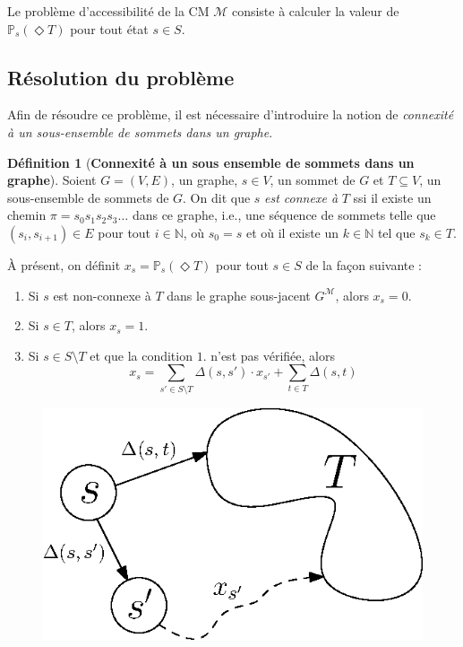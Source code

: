 \documentclass[12pt,a4paper]{report}
\theoremstyle{definition}%
\newtheorem{definition}{Définition}[chapter]
\theoremstyle{remark}
\begin{document}
Le problème d'accessibilité de la CM $\mathcal{M}$ consiste à calculer la valeur de $\mathbb{P}_s(\Diamond T)$ pour tout état $s \in S$.

\subsection{Résolution du problème}
Afin de résoudre ce problème, il est nécessaire d'introduire la notion de
\textit{connexité à un sous-ensemble de sommets dans un graphe}.
\begin{definition}[\textbf{Connexité à un sous ensemble de sommets dans un graphe}]
Soient $G=(V, E)$, un graphe, $s \in V$, un sommet de $G$ et $T \subseteq V$,
un sous-ensemble de sommets de $G$. On dit que $s$ \textit{est connexe à} $T$ ssi
il existe un chemin $\pi = s_0 s_1s_2s_3 \dots$ dans ce graphe, i.e., une séquence de
sommets telle que $(s_i, s_{i+1}) \in E$ pour tout $i \in \mathbb{N}$, où
$s_0 = s$ et où il existe un $k \in \mathbb{N}$ tel que $s_k \in T$.
\end{definition}

\`A présent, on définit $x_s = \mathbb{P}_s(\Diamond T)$ pour tout $s \in S$ de la façon suivante :
\begin{enumerate}
	\item Si $s$ est non-connexe à $T$ dans le graphe sous-jacent $G^\mathcal{M}$, alors $x_s = 0$.
	\item Si $s \in T$, alors $x_s = 1$.
	\item Si $s \in S \setminus T$ et que la condition $1.$ n'est pas vérifiée, alors
		\[ x_s = \sum_{s' \in S \setminus T} \Delta(s, s') \cdot x_{s'} + \sum_{t \in T} \Delta(s, t) \]
\end{enumerate}

\begin{figure}[H]
	\centering
	\includegraphics[scale=0.6]{figures/reachability.eps}
	\label{reachablity}
\end{figure}
\end{document}

